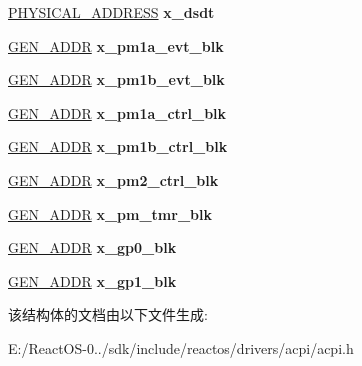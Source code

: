 \begin{DoxyCompactItemize}
\mbox{\label{struct___f_a_d_t_a92a289cf11e0a916c57b92814df042df}} 
\hyperlink{union___l_a_r_g_e___i_n_t_e_g_e_r}{P\+H\+Y\+S\+I\+C\+A\+L\+\_\+\+A\+D\+D\+R\+E\+SS} {\bfseries x\+\_\+dsdt}
\item 
\mbox{\label{struct___f_a_d_t_a032d0e932cdffb734cd00b10bb92a53e}} 
\hyperlink{struct___g_e_n___a_d_d_r}{G\+E\+N\+\_\+\+A\+D\+DR} {\bfseries x\+\_\+pm1a\+\_\+evt\+\_\+blk}
\item 
\mbox{\label{struct___f_a_d_t_a90a43f85d17b9f71d1c90acd1bab5698}} 
\hyperlink{struct___g_e_n___a_d_d_r}{G\+E\+N\+\_\+\+A\+D\+DR} {\bfseries x\+\_\+pm1b\+\_\+evt\+\_\+blk}
\item 
\mbox{\label{struct___f_a_d_t_a162cd9ab6ba3e96a18de800b3d276432}} 
\hyperlink{struct___g_e_n___a_d_d_r}{G\+E\+N\+\_\+\+A\+D\+DR} {\bfseries x\+\_\+pm1a\+\_\+ctrl\+\_\+blk}
\item 
\mbox{\label{struct___f_a_d_t_a6201fad09743a50b77a40917fffb7972}} 
\hyperlink{struct___g_e_n___a_d_d_r}{G\+E\+N\+\_\+\+A\+D\+DR} {\bfseries x\+\_\+pm1b\+\_\+ctrl\+\_\+blk}
\item 
\mbox{\label{struct___f_a_d_t_a95472064a5c0ba1a743d210f2264a0de}} 
\hyperlink{struct___g_e_n___a_d_d_r}{G\+E\+N\+\_\+\+A\+D\+DR} {\bfseries x\+\_\+pm2\+\_\+ctrl\+\_\+blk}
\item 
\mbox{\label{struct___f_a_d_t_a86fa3e65d56ebdf4742f08c47548daa1}} 
\hyperlink{struct___g_e_n___a_d_d_r}{G\+E\+N\+\_\+\+A\+D\+DR} {\bfseries x\+\_\+pm\+\_\+tmr\+\_\+blk}
\item 
\mbox{\label{struct___f_a_d_t_a375dfafaee2411f0826be96bb101a100}} 
\hyperlink{struct___g_e_n___a_d_d_r}{G\+E\+N\+\_\+\+A\+D\+DR} {\bfseries x\+\_\+gp0\+\_\+blk}
\item 
\mbox{\label{struct___f_a_d_t_a06b3a4b3f11408b6c437d0656585a157}} 
\hyperlink{struct___g_e_n___a_d_d_r}{G\+E\+N\+\_\+\+A\+D\+DR} {\bfseries x\+\_\+gp1\+\_\+blk}
\end{DoxyCompactItemize}


该结构体的文档由以下文件生成\+:\begin{DoxyCompactItemize}
\item 
E\+:/\+React\+O\+S-\/0../sdk/include/reactos/drivers/acpi/acpi.\+h\end{DoxyCompactItemize}
